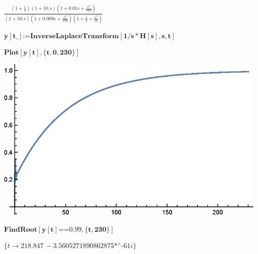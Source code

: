 \documentclass{article}
\numberwithin{equation}{section}
\begin{document}
\begin{enumerate}[label=\textbf{1.\arabic*}]
        \begin{doublespace}
        \noindent\(\frac{\left(1+\frac{s}{2}\right) (1+10. s) \left(1+0.01 s+\frac{s^2}{100}\right)}{(1+50. s) \left(1+0.009 s+\frac{s^2}{100}\right) \left(1+\frac{s}{4}+\frac{s^2}{16}\right)}\)
        \end{doublespace}
        
        \begin{doublespace}
        \noindent\(\pmb{y[\text{t$\_$}]\text{:=}\text{InverseLaplaceTransform}[1/s*H[s],s,t]}\)
        \end{doublespace}
        
        \begin{doublespace}
        \noindent\(\pmb{\text{Plot}[y[t],\{t,0,230\}]}\)
        \end{doublespace}
        
        \includegraphics{pset1_gr1.eps}
        
        \begin{doublespace}
        \noindent\(\pmb{\text{FindRoot}[y[t]\text{==}0.99,\{t,230\}]}\)
        \end{doublespace}
        
        \begin{doublespace}
        \noindent\(\{t\to 218.847\, -\text{3.5605271890862875$\grave{ }$*${}^{\wedge}$-61} i\}\)
        \end{doublespace}
        

\end{enumerate}
\end{document}
